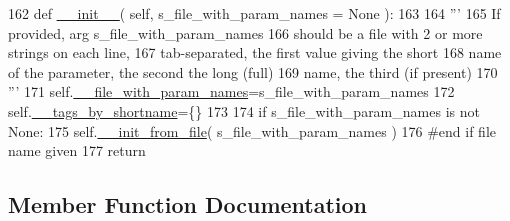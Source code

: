 \begin{DoxyCode}
162     \textcolor{keyword}{def }\hyperlink{classnegui_1_1pgparamset_1_1PGParamSet_a598ea6a166f56fe5be01f86d4d8c91ba}{\_\_init\_\_}( self, s\_file\_with\_param\_names = None ):
163 
164         \textcolor{stringliteral}{'''}
165 \textcolor{stringliteral}{        If provided, arg s\_file\_with\_param\_names}
166 \textcolor{stringliteral}{        should be a file with 2 or more strings on each line,}
167 \textcolor{stringliteral}{        tab-separated, the first value giving the short}
168 \textcolor{stringliteral}{        name of the parameter, the second the long (full)}
169 \textcolor{stringliteral}{        name, the third (if present)}
170 \textcolor{stringliteral}{        '''}
171         self.\hyperlink{classnegui_1_1pgparamset_1_1PGParamSet_aafa67026a09aa523151728cba95e0d6d}{\_\_file\_with\_param\_names}=s\_file\_with\_param\_names
172         self.\hyperlink{classnegui_1_1pgparamset_1_1PGParamSet_aa13eaff9049bc16fa4090c8b85915f3c}{\_\_tags\_by\_shortname}=\{\}
173 
174         \textcolor{keywordflow}{if} s\_file\_with\_param\_names \textcolor{keywordflow}{is} \textcolor{keywordflow}{not} \textcolor{keywordtype}{None}:
175             self.\hyperlink{classnegui_1_1pgparamset_1_1PGParamSet_abc19f133ab3ecc86ec8099549b0b45bb}{\_\_init\_from\_file}( s\_file\_with\_param\_names )
176         \textcolor{comment}{#end if file name given}
177         \textcolor{keywordflow}{return}
\end{DoxyCode}


\subsection{Member Function Documentation}
